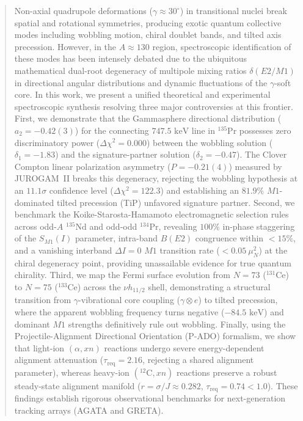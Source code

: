 \documentclass[aps,prc,twocolumn,showpacs,superscriptaddress,floatfix,nofootinbib]{revtex4-2}
\begin{document}
\begin{abstract}
Non-axial quadrupole deformations ($\gamma \approx 30^\circ$) in transitional nuclei break spatial and rotational symmetries, producing exotic quantum collective modes including wobbling motion, chiral doublet bands, and tilted axis precession. However, in the $A \approx 130$ region, spectroscopic identification of these modes has been intensely debated due to the ubiquitous mathematical dual-root degeneracy of multipole mixing ratios $\delta(E2/M1)$ in directional angular distributions and dynamic fluctuations of the $\gamma$-soft core. In this work, we present a unified theoretical and experimental spectroscopic synthesis resolving three major controversies at this frontier.
First, we demonstrate that the Gammasphere directional distribution ($a_2 = -0.42(3)$) for the connecting $747.5\text{ keV}$ line in $^{135}\text{Pr}$ possesses zero discriminatory power ($\Delta\chi^2 = 0.000$) between the wobbling solution ($\delta_1 = -1.83$) and the signature-partner solution ($\delta_2 = -0.47$). The Clover Compton linear polarization asymmetry ($P = -0.21(4)$) measured by JUROGAM~II breaks this degeneracy, rejecting the wobbling hypothesis at an $11.1\sigma$ confidence level ($\Delta\chi^2 = 122.3$) and establishing an $81.9\%$ $M1$-dominated tilted precession (TiP) unfavored signature partner.
Second, we benchmark the Koike-Starosta-Hamamoto electromagnetic selection rules across odd-$A$ $^{135}\text{Nd}$ and odd-odd $^{134}\text{Pr}$, revealing $100\%$ in-phase staggering of the $S_{M1}(I)$ parameter, intra-band $B(E2)$ congruence within $<15\%$, and a vanishing interband $\Delta I=0$ $M1$ transition rate ($<0.05\ \mu_N^2$) at the chiral degeneracy point, providing unassailable evidence for true quantum chirality.
Third, we map the Fermi surface evolution from $N=73$ ($^{131}\text{Ce}$) to $N=75$ ($^{133}\text{Ce}$) across the $\nu h_{11/2}$ shell, demonstrating a structural transition from $\gamma$-vibrational core coupling ($\gamma \otimes e$) to tilted precession, where the apparent wobbling frequency turns negative ($-84.5\text{ keV}$) and dominant $M1$ strengths definitively rule out wobbling.
Finally, using the Projectile-Alignment Directional Orientation (P-ADO) formalism, we show that light-ion $(\alpha, xn)$ reactions undergo severe energy-dependent alignment attenuation ($\tau_{\text{req}} = 2.16$, rejecting a shared alignment parameter), whereas heavy-ion $(^{12}\text{C}, xn)$ reactions preserve a robust steady-state alignment manifold ($r = \sigma/J \approx 0.282$, $\tau_{\text{req}} = 0.74 < 1.0$).
These findings establish rigorous observational benchmarks for next-generation tracking arrays (AGATA and GRETA).
\end{abstract}
\end{document}

